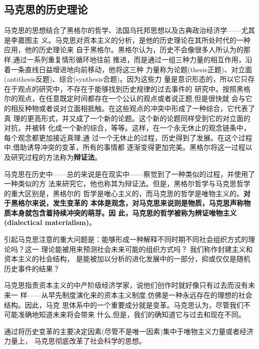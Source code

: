 \subsection{马克思的历史理论}

马克思的思想结合了黑格尔的哲学、法国乌托邦思想以及古典政治经济学——尤其是李嘉图主
义。马克思对资本主义的分析，是他的历史理论在其所处时代的一种应用，他的历史理论来
自于黑格尔。黑格尔认为，历史不会像很多人所认为的那样,通过一系列重复情形循环地往前
推进，而是通过一组三种力量的相互作用，沿着一条直线日益增进地向前移动，他将这三种
力量称为论题(thesis正题)、对立面(antithesis反题)、综合(synthesis合题)。因为这些力
量是意识形态的，所以它只存在于观点的研究中，不存在于能够找到历史规律的过去事件的
研究中。按照黑格尔的观点，在任意既定时间都存在一个公认的观点或者说正题,但是很快就
会与它的相反种物或者说对立面相抵触。在这些观点的冲突中形成了一种综合，它代表了真
理的更高形式，并又成了一个新的论题。这个新的论题同样受到它的对立面的对抗，并被转
化成一个新的综合，等等。这样，在一个永无休止的观念链条中，每个观念都更加接近真理,通
过一个无休止的过程，历史得到了发展。在这个过程中,借助诱导冲突的变革，所有的事情都
逐渐变得更加完美。黑格尔将这一过程以及研究过程的方法称为\textbf{辩证法}。

马克思在历史中——总的来说是在现实中——察觉到了一种类似的过程，并使用了一种类似的方
法来研究它，他也称其为辩证法。但是，黑格尔哲学与马克思哲学的重大区别是，黑格尔的
哲学是唯心主义的，而马克思的哲学是唯物主义的。\textbf{对于黑格尔来说，发生变革的
  本体是观念，对马克思来说则是物质，马克思声称物质本身就包含着持续冲突的萌芽。因
  此，马克思的哲学被称为辨证唯物主义(dialectical materialism)}。

引起马克思注意的重大问题是：能够形成一种解释不同时期不同社会组织方式的理论吗？这一
理论能被用来预测社会未来可能的组织方式吗？ 我们称作封建主义和资本主义的社会结构，
是能被加以分析的进化发展中的一部分，抑或仅仅是随机历史事件的结果？

马克思指责资本主义的中产阶级经济学家，说他们创作时就好像只有过去而没有未来一
样——从早先制度演化来的资本主义制度,仿佛是一种永远存在的理想的社会结构。因此，马克
思体系中的一个重要成分就是变革。马克思认为，尽管我们不可能准确地知道未来将会带来
什么,但是，我们的确知道它与过去和现在不同。

通过将历史变革的主要决定因素(尽管不是唯一因素)集中于唯物主义力量或者经济力量上，
马克思彻底改革了社会科学的思想。

